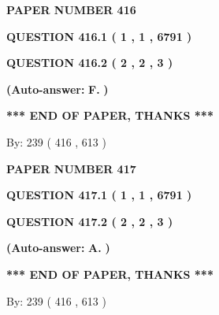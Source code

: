 \documentclass[12pt]{article}
\begin{document}
 
 
   
   
   
   
   
   
 
 
 
 
   
   
   
   
\setcounter{page}{ 
   416001 } 
   
   
 {\textbf{ \Large{ PAPER NUMBER  416  }}}
   
   
   
   
  
  
{\textbf{\large{QUESTION
416.1 
 ( 1 , 1 , 6791 )
}}}
  
  
{\textbf{\large{QUESTION
416.2 
 ( 2 , 2 , 3 )
}}}
 
 
{\textbf{(Auto-answer:}}
{\textbf{\large{
F.}}}
{\textbf{)}}
 
 
   
   
   
   
\vspace{1.0in} 
{\textbf{\large{ *** END OF PAPER, THANKS *** }}} 
   
   
\hspace{1.0in} By: 
 239 ( 416 ,  613 )
   
   
   
   
\newpage 
\setcounter{page}{ 
   417001 } 
   
   
 {\textbf{ \Large{ PAPER NUMBER  417  }}}
   
   
   
   
  
  
{\textbf{\large{QUESTION
417.1 
 ( 1 , 1 , 6791 )
}}}
  
  
{\textbf{\large{QUESTION
417.2 
 ( 2 , 2 , 3 )
}}}
 
 
{\textbf{(Auto-answer:}}
{\textbf{\large{
A.}}}
{\textbf{)}}
 
 
   
   
   
   
\vspace{1.0in} 
{\textbf{\large{ *** END OF PAPER, THANKS *** }}} 
   
   
\hspace{1.0in} By: 
 239 ( 416 ,  613 )
   
   
   
   
\newpage 
\setcounter{page}{ 
   418001 } 
   
\end{document}
